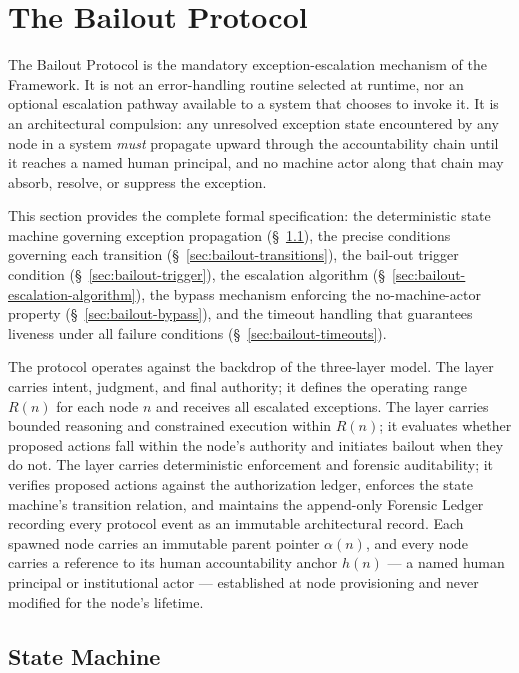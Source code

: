 \section{The Bailout Protocol}\label{sec:bailout}

The Bailout Protocol is the mandatory exception-escalation mechanism of the \bxthree{} Framework. It is not an error-handling routine selected at runtime, nor an optional escalation pathway available to a system that chooses to invoke it. It is an architectural compulsion: any unresolved exception state encountered by any node in a \bxthree{} system \emph{must} propagate upward through the accountability chain until it reaches a named human principal, and no machine actor along that chain may absorb, resolve, or suppress the exception.

This section provides the complete formal specification: the deterministic state machine governing exception propagation (\S~\ref{sec:bailout-state-machine}), the precise conditions governing each transition (\S~\ref{sec:bailout-transitions}), the bail-out trigger condition (\S~\ref{sec:bailout-trigger}), the escalation algorithm (\S~\ref{sec:bailout-escalation-algorithm}), the bypass mechanism enforcing the no-machine-actor property (\S~\ref{sec:bailout-bypass}), and the timeout handling that guarantees liveness under all failure conditions (\S~\ref{sec:bailout-timeouts}).

The protocol operates against the backdrop of the \bxthree{} three-layer model. The \purpose{} layer carries intent, judgment, and final authority; it defines the operating range $R(n)$ for each node $n$ and receives all escalated exceptions. The \bounds{} layer carries bounded reasoning and constrained execution within $R(n)$; it evaluates whether proposed actions fall within the node's authority and initiates bailout when they do not. The \fact{} layer carries deterministic enforcement and forensic auditability; it verifies proposed actions against the authorization ledger, enforces the state machine's transition relation, and maintains the append-only Forensic Ledger recording every protocol event as an immutable architectural record. Each spawned node carries an immutable parent pointer $\alpha(n)$, and every node carries a reference to its human accountability anchor $h(n)$ --- a named human principal or institutional actor --- established at node provisioning and never modified for the node's lifetime.

\subsection{State Machine}\label{sec:bailout-state-machine}

